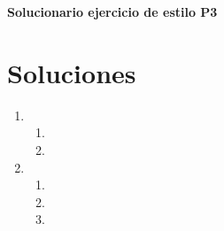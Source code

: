 \documentclass[spanish,12pt]{article}
\begin{document}
	\begin{titlepage}
	\begin{center}
	\hspace{0pt}
	\vfill
	{\Large\textbf{{Solucionario ejercicio de estilo P3}}}
	
	\thispagestyle{empty}
	\vfill
	\end{center}
	\end{titlepage}
\newpage
\section{Soluciones}
\begin{enumerate}[1)]
    \item 
    \begin{enumerate}
        \item 
        \item 
    \end{enumerate}
    \item 
    \begin{enumerate}
        \item 
        \item 
        \item 
    
    \end{enumerate}
\end{enumerate}
\end{document}
